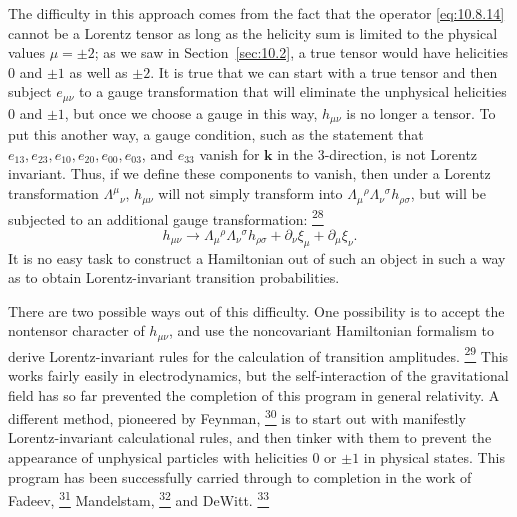 The difficulty in this approach comes from the fact that the operator
\eqref{eq:10.8.14} cannot be a Lorentz tensor as long as the helicity sum is
limited to the physical values \(\mu=\pm2\); as we saw in
Section~\ref{sec:10.2}, a true tensor would have helicities 0 and \(\pm1\)
as well as \(\pm2\). It is true that we can start with a true tensor and then
subject \(e_{\mu\nu}\) to a gauge transformation that will eliminate the
unphysical helicities 0 and \(\pm1\), but once we choose a gauge in this way,
\(h_{\mu\nu}\) is no longer a tensor. To put this another way, a gauge
condition, such as the statement that
\(e_{13},e_{23},e_{10},e_{20},e_{00},e_{03}\), and \(e_{33}\) vanish for
\(\mathbf{k}\) in the 3-direction, is not Lorentz invariant. Thus, if we
define these components to vanish, then under a Lorentz transformation
\(\Lambda^\mu{}_\nu\), \(h_{\mu\nu}\) will not simply transform into
\(\Lambda_\mu{}^\rho\Lambda_\nu{}^\sigma h_{\rho\sigma}\), but will be
subjected to an additional gauge transformation:%
\hyperref[ch10-ref-28]{\textsuperscript{28}}
\[
  h_{\mu\nu}
  \longrightarrow
  \Lambda_\mu{}^\rho\Lambda_\nu{}^\sigma h_{\rho\sigma}
  +\partial_\nu\xi_\mu+\partial_\mu\xi_\nu.
\]
It is no easy task to construct a Hamiltonian out of such an object in such a
way as to obtain Lorentz-invariant transition probabilities.

There are two possible ways out of this difficulty. One possibility is to
accept the nontensor character of \(h_{\mu\nu}\), and use the noncovariant
Hamiltonian formalism to derive Lorentz-invariant rules for the calculation of
transition amplitudes.%
\hyperref[ch10-ref-29]{\textsuperscript{29}}
This works fairly easily in electrodynamics, but the self-interaction of the
gravitational field has so far prevented the completion of this program in
general relativity. A different method, pioneered by Feynman,%
\hyperref[ch10-ref-30]{\textsuperscript{30}}
is to start out with manifestly Lorentz-invariant calculational rules, and
then tinker with them to prevent the appearance of unphysical particles with
helicities 0 or \(\pm1\) in physical states. This program has been
successfully carried through to completion in the work of Fadeev,%
\hyperref[ch10-ref-31]{\textsuperscript{31}}
Mandelstam,%
\hyperref[ch10-ref-32]{\textsuperscript{32}}
and DeWitt.%
\hyperref[ch10-ref-33]{\textsuperscript{33}}

